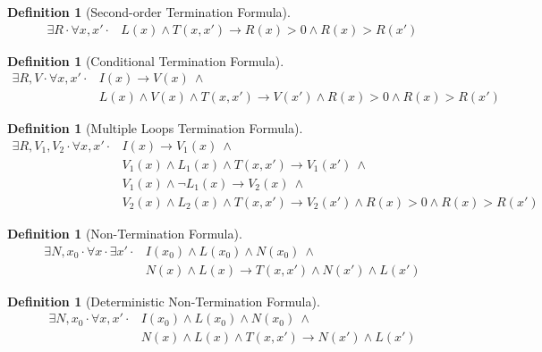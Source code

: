 \documentclass[preprint]{sigplanconf}
\theoremstyle{definition}
\newtheorem{definition}[theorem]{Definition}
\begin{document}
\begin{figure*}
\begin{framed}
\begin{definition}[Second-order Termination Formula]
\label{def:termination-formula}
\begin{align*}
 \exists R \cdot \forall x, x' \cdot & L(x) \wedge T(x, x') \rightarrow R(x) > 0 \wedge R(x) > R(x')
\end{align*}
\end{definition}

\begin{definition}[Conditional Termination Formula]
\label{def:conditional-termination-formula}
 \begin{align*}
  \exists R, V \cdot \forall x, x' \cdot & I(x) \rightarrow V(x) ~ \wedge \\
                                 & L(x) \wedge V(x) \wedge T(x, x') \rightarrow V(x') \wedge R(x) > 0 \wedge R(x) > R(x')
 \end{align*}
\end{definition}

\begin{definition}[Multiple Loops Termination Formula]
\label{def:multi-termination-formula}
 \begin{align*}
  \exists R, V_1, V_2 \cdot \forall x, x' \cdot & I(x) \rightarrow V_1(x) ~ \wedge \\
                                        & V_1(x) \wedge L_1(x) \wedge T(x, x') \rightarrow V_1(x') ~ \wedge \\
                                        & V_1(x) \wedge \lnot L_1(x) \rightarrow V_2(x) ~ \wedge \\
                                        & V_2(x) \wedge L_2(x) \wedge T(x, x') \rightarrow V_2(x') \wedge R(x) > 0 \wedge R(x) > R(x')
 \end{align*}
\end{definition}

\begin{definition}[Non-Termination Formula]
\label{def:nonterm-formula}
 \begin{align*}
  \exists N, x_0 \cdot \forall x \cdot \exists x' \cdot & I(x_0) \wedge L(x_0) \wedge N(x_0) ~ \wedge \\
							& N(x) \wedge L(x) \rightarrow T(x, x') \wedge N(x') \wedge L(x')
 \end{align*}
\end{definition}

\begin{definition}[Deterministic Non-Termination Formula]
\label{def:deterministic-nonterm-formula}
 \begin{align*}
  \exists N, x_0 \cdot \forall x, x' \cdot & I(x_0) \wedge L(x_0) \wedge N(x_0) ~ \wedge \\
							& N(x) \wedge L(x) \wedge T(x, x') \rightarrow N(x') \wedge L(x')
 \end{align*} 
\end{definition}
\end{framed}
\end{figure*}
\end{document}
